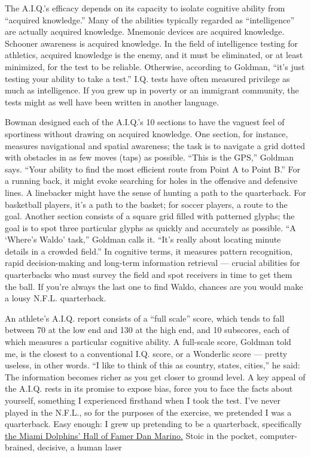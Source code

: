 The A.I.Q.'s efficacy depends on its capacity to isolate cognitive
ability from ``acquired knowledge.'' Many of the abilities typically
regarded as ``intelligence'' are actually acquired knowledge. Mnemonic
devices are acquired knowledge. Schooner awareness is acquired
knowledge. In the field of intelligence testing for athletics, acquired
knowledge is the enemy, and it must be eliminated, or at least
minimized, for the test to be reliable. Otherwise, according to Goldman,
``it's just testing your ability to take a test.'' I.Q. tests have often
measured privilege as much as intelligence. If you grew up in poverty or
an immigrant community, the tests might as well have been written in
another language.

Bowman designed each of the A.I.Q.'s 10 sections to have the vaguest
feel of sportiness without drawing on acquired knowledge. One section,
for instance, measures navigational and spatial awareness; the task is
to navigate a grid dotted with obstacles in as few moves (taps) as
possible. ``This is the GPS,'' Goldman says. ``Your ability to find the
most efficient route from Point A to Point B.'' For a running back, it
might evoke searching for holes in the offensive and defensive lines. A
linebacker might have the sense of hunting a path to the quarterback.
For basketball players, it's a path to the basket; for soccer players, a
route to the goal. Another section consists of a square grid filled with
patterned glyphs; the goal is to spot three particular glyphs as quickly
and accurately as possible. ``A `Where's Waldo' task,'' Goldman calls
it. ``It's really about locating minute details in a crowded field.'' In
cognitive terms, it measures pattern recognition, rapid decision-making
and long-term information retrieval --- crucial abilities for
quarterbacks who must survey the field and spot receivers in time to get
them the ball. If you're always the last one to find Waldo, chances are
you would make a lousy N.F.L. quarterback.

An athlete's A.I.Q. report consists of a ``full scale'' score, which
tends to fall between 70 at the low end and 130 at the high end, and 10
subscores, each of which measures a particular cognitive ability. A
full-scale score, Goldman told me, is the closest to a conventional I.Q.
score, or a Wonderlic score --- pretty useless, in other words. ``I like
to think of this as country, states, cities,'' he said: The information
becomes richer as you get closer to ground level. A key appeal of the
A.I.Q. rests in its promise to expose bias, force you to face the facts
about yourself, something I experienced firsthand when I took the test.
I've never played in the N.F.L., so for the purposes of the exercise, we
pretended I was a quarterback. Easy enough: I grew up pretending to be a
quarterback, specifically
\href{https://www.nfl.com/videos/miami-dolphins-quarterback-dan-marino-career-highlights-nfl-legends-436975}{the
Miami Dolphins' Hall of Famer Dan Marino.} Stoic in the pocket,
computer-brained, decisive, a human laser


